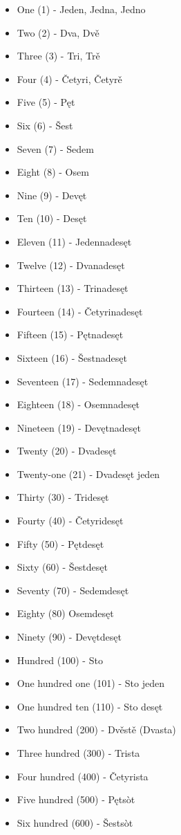 \begin{itemize}
	\item One (1) - Jeden, Jedna, Jedno
	\item Two (2) - Dva, Dvě
	\item Three (3) - Tri, Trě
	\item Four (4) - Četyri, Četyrě
	\item Five (5) - Pęt
	\item Six (6) - Šest
	\item Seven (7) - Sedem
	\item Eight (8) - Osem
	\item Nine (9) - Devęt
	\item Ten (10) - Desęt
	\item Eleven (11) - Jedennadesęt
	\item Twelve (12) - Dvanadesęt
	\item Thirteen (13) - Trinadesęt
	\item Fourteen (14) - Četyrinadesęt
	\item Fifteen (15) - Pętnadesęt
	\item Sixteen (16) - Šestnadesęt
	\item Seventeen (17) - Sedemnadesęt
	\item Eighteen (18) - Osemnadesęt
	\item Nineteen (19) - Devętnadesęt
	\item Twenty (20) - Dvadesęt
	\item Twenty-one (21) - Dvadesęt jeden
	\item Thirty (30) - Tridesęt
	\item Fourty (40) - Četyridesęt
	\item Fifty (50) - Pętdesęt
	\item Sixty (60) - Šestdesęt
	\item Seventy (70) - Sedemdesęt
	\item Eighty (80) Osemdesęt
	\item Ninety (90) - Devętdesęt
	\item Hundred (100) - Sto
	\item One hundred one (101) - Sto jeden
	\item One hundred ten (110) - Sto desęt
	\item Two hundred (200) - Dvěstě (Dvasta)
	\item Three hundred (300) - Trista
	\item Four hundred (400) - Četyrista
	\item Five hundred (500) - Pętsòt
	\item Six hundred (600) - Šestsòt

\end{itemize}
